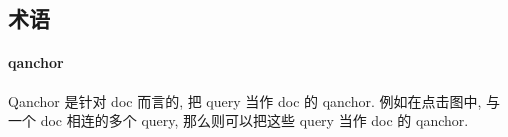 \subsection{术语}
\paragraph{qanchor}
Qanchor 是针对 doc 而言的, 把 query 当作 doc 的 qanchor. 例如在点击图中, 与一个 doc 相连的多个 query, 那么则可以把这些 query 当作 doc 的 qanchor.